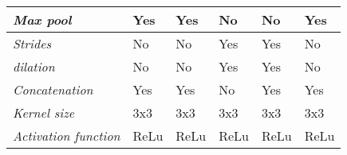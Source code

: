 \begin{table}[]
\begin{tabular}{|l|l|l|l|l|l|}
		\textit{Max pool}                  & Yes                                                               & Yes                                                               & No                                                                & No                                                                                       & Yes                                                                            \\ \hline
		\textit{Strides}                   & No                                                                & No                                                                & Yes                                                               & Yes                                                                                      & No                                                                             \\ \hline
		\textit{dilation}                  & No                                                                & No                                                                & Yes                                                               & Yes                                                                                      & No                                                                             \\ \hline
		\textit{Concatenation}             & Yes                                                               & Yes                                                               & No                                                                & Yes                                                                                      & Yes                                                                            \\ \hline
		\textit{Kernel size}               & 3x3                                                               & 3x3                                                               & 3x3                                                               & 3x3                                                                                      & 3x3                                                                            \\ \hline
		\textit{Activation function}       & ReLu                                                              & ReLu                                                              & ReLu                                                              & ReLu                                                                                     & ReLu                                                                           \\ \hline

\end{tabular}
\end{table}

